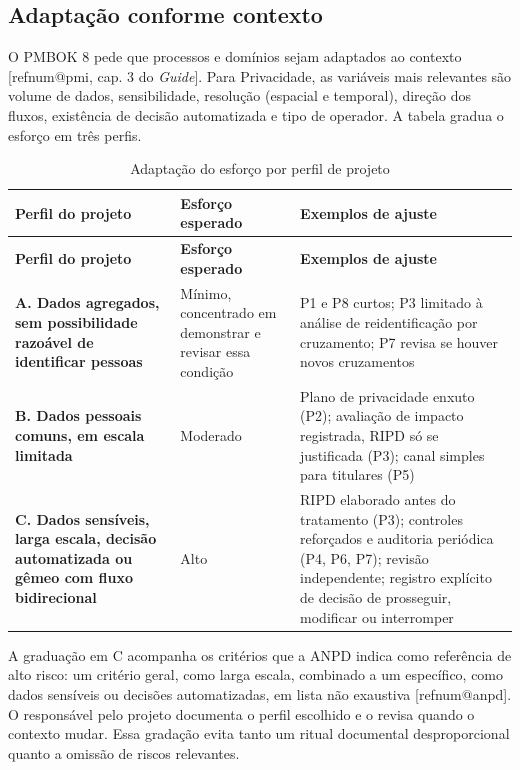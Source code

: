 \documentclass[12pt,a4paper,article,oneside,english,brazil]{abntex2}
\makeatletter
\newcommand{\fontetab}[1]{\par\vspace{3pt}{\small\noindent Fonte: #1\par}}
\newcommand{\refnum}[1]{\csname refnum@#1\endcsname}
\newcommand{\cit}[1]{[\refnum{#1}]}
\makeatother
\begin{document}
\subsection{Adaptação conforme contexto}

O PMBOK 8 pede que processos e domínios sejam adaptados ao contexto [\refnum{pmi}, cap. 3 do \textit{Guide}]. Para Privacidade, as variáveis mais relevantes são volume de dados, sensibilidade, resolução (espacial e temporal), direção dos fluxos, existência de decisão automatizada e tipo de operador. A tabela gradua o esforço em três perfis.

\begingroup\SingleSpacing\small
\begin{longtable}{@{}>{\raggedright\arraybackslash}p{}>{\raggedright\arraybackslash}p{}>{\raggedright\arraybackslash}p{}@{}}
\caption{Adaptação do esforço por perfil de projeto}\label{tab:t5}\\
\hline
\textbf{Perfil do projeto} & \textbf{Esforço esperado} & \textbf{Exemplos de ajuste}\\
\hline
\endfirsthead
\hline
\textbf{Perfil do projeto} & \textbf{Esforço esperado} & \textbf{Exemplos de ajuste}\\
\hline
\endhead
\hline
\endfoot
\hline
\endlastfoot
\textbf{A. Dados agregados, sem possibilidade razoável de identificar pessoas} & Mínimo, concentrado em demonstrar e revisar essa condição & P1 e P8 curtos; P3 limitado à análise de reidentificação por cruzamento; P7 revisa se houver novos cruzamentos\\[3pt]
\textbf{B. Dados pessoais comuns, em escala limitada} & Moderado & Plano de privacidade enxuto (P2); avaliação de impacto registrada, RIPD só se justificada (P3); canal simples para titulares (P5)\\[3pt]
\textbf{C. Dados sensíveis, larga escala, decisão automatizada ou gêmeo com fluxo bidirecional} & Alto & RIPD elaborado antes do tratamento (P3); controles reforçados e auditoria periódica (P4, P6, P7); revisão independente; registro explícito de decisão de prosseguir, modificar ou interromper\\[3pt]
\end{longtable}
\endgroup
\fontetab{Elaborado pelos autores (2026), com base em \cit{anpd}.}

A graduação em C acompanha os critérios que a ANPD indica como referência de alto risco: um critério geral, como larga escala, combinado a um específico, como dados sensíveis ou decisões automatizadas, em lista não exaustiva [\refnum{anpd}]. O responsável pelo projeto documenta o perfil escolhido e o revisa quando o contexto mudar. Essa gradação evita tanto um ritual documental desproporcional quanto a omissão de riscos relevantes.
\end{document}
